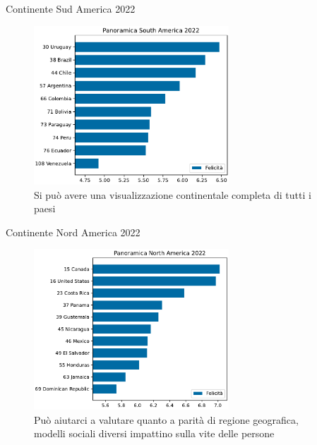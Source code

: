 \documentclass{beamer}
\begin{document}
\begin{frame}{Continente Sud America 2022}
	\begin{figure}
		\centering
		\includegraphics[width=0.65\textwidth]{"./img/4Classifica_South America_2022.pdf"}
		\caption{Si può avere una visualizzazione continentale completa di tutti i paesi}
	\end{figure}
\end{frame}

\begin{frame}{Continente Nord America 2022}
	\begin{figure}
		\centering
		\includegraphics[width=0.65\textwidth]{"./img/4Classifica_North America_2022.pdf"}
		\caption{Può aiutarci a valutare quanto a parità di regione geografica, modelli sociali diversi impattino sulla vite delle persone}
	\end{figure}
\end{frame}
\end{document}
